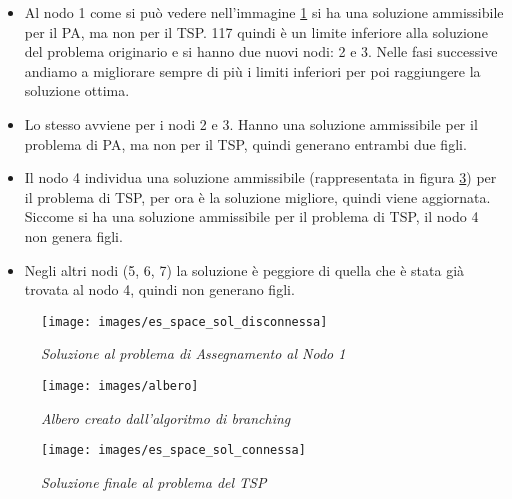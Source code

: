 \begin{itemize}
    \item Al nodo 1 come si può vedere nell'immagine \ref{img:es_space_sol_disconnessa} si ha una soluzione ammissibile per il PA, ma non per il TSP. 117 quindi è un limite inferiore alla soluzione del problema originario e si hanno due nuovi nodi: 2 e 3. Nelle fasi successive andiamo a migliorare sempre di più i limiti inferiori per poi raggiungere la soluzione ottima.
    \item Lo stesso avviene per i nodi 2 e 3. Hanno una soluzione ammissibile per il problema di PA, ma non per il TSP, quindi generano entrambi due figli.
    \item Il nodo 4 individua una soluzione ammissibile (rappresentata in figura \ref{img:es_space_sol_connessa}) per il problema di TSP, per ora è la soluzione migliore, quindi viene aggiornata. Siccome si ha una soluzione ammissibile per il problema di TSP, il nodo 4 non genera figli.
    \item Negli altri nodi (5, 6, 7) la soluzione è peggiore di quella che è stata già trovata al nodo 4, quindi non generano figli.
\end{itemize}

\begin{figure}[ht]
	\centering
	\texttt{[image: images/es\_space\_sol\_disconnessa]}
	\caption{\textit{Soluzione al problema di Assegnamento al Nodo 1}}
	\label{img:es_space_sol_disconnessa}
\end{figure}

\begin{figure}[ht]
	\centering
	\texttt{[image: images/albero]}
	\caption{\textit{Albero creato dall'algoritmo di branching}}
	\label{img:albero}
\end{figure}

\begin{figure}[ht]
	\centering
	\texttt{[image: images/es\_space\_sol\_connessa]}
	\caption{\textit{Soluzione finale al problema del TSP}}
	\label{img:es_space_sol_connessa}
\end{figure}